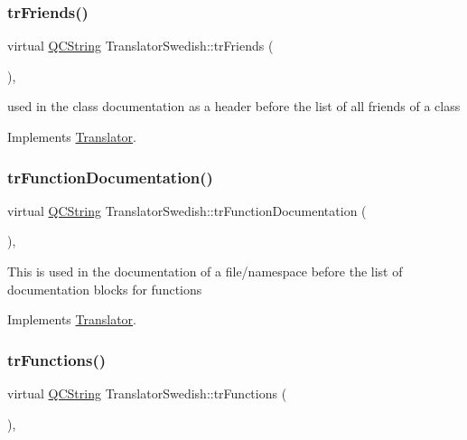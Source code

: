 \subsubsection{\texorpdfstring{trFriends()}{trFriends()}}
{\footnotesize\ttfamily virtual \mbox{\hyperlink{class_q_c_string}{Q\+C\+String}} Translator\+Swedish\+::tr\+Friends (\begin{DoxyParamCaption}{ }\end{DoxyParamCaption})\hspace{0.3cm}{\ttfamily [inline]}, {\ttfamily [virtual]}}

used in the class documentation as a header before the list of all friends of a class 

Implements \mbox{\hyperlink{class_translator}{Translator}}.

\mbox{\label{class_translator_swedish_a84d9facd73567e86daae525d4c3ae8f0}} 
\subsubsection{\texorpdfstring{trFunctionDocumentation()}{trFunctionDocumentation()}}
{\footnotesize\ttfamily virtual \mbox{\hyperlink{class_q_c_string}{Q\+C\+String}} Translator\+Swedish\+::tr\+Function\+Documentation (\begin{DoxyParamCaption}{ }\end{DoxyParamCaption})\hspace{0.3cm}{\ttfamily [inline]}, {\ttfamily [virtual]}}

This is used in the documentation of a file/namespace before the list of documentation blocks for functions 

Implements \mbox{\hyperlink{class_translator}{Translator}}.

\mbox{\label{class_translator_swedish_a773e11b5180a9f6e3214682d183fb742}} 
\subsubsection{\texorpdfstring{trFunctions()}{trFunctions()}}
{\footnotesize\ttfamily virtual \mbox{\hyperlink{class_q_c_string}{Q\+C\+String}} Translator\+Swedish\+::tr\+Functions (\begin{DoxyParamCaption}{ }\end{DoxyParamCaption})\hspace{0.3cm}{\ttfamily [inline]}, {\ttfamily [virtual]}}

